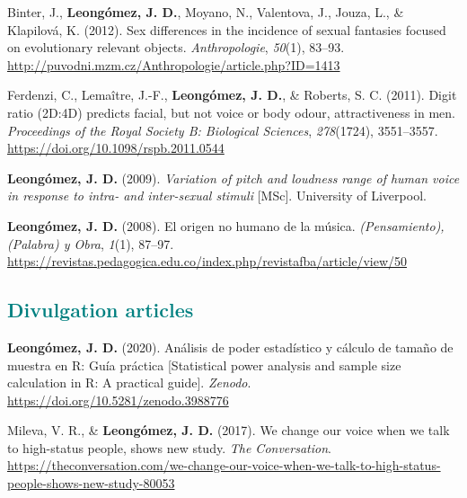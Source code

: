 \documentclass[11pt, a4paper]{awesome-cv}
\begin{document}
\leavevmode{}%
Binter, J., \textbf{Leongómez, J. D.}, Moyano, N., Valentova, J., Jouza,
L., \& Klapilová, K. (2012). {Sex differences in the incidence of sexual
fantasies focused on evolutionary relevant objects.}
\emph{Anthropologie}, \emph{50}(1), 83--93.
\url{http://puvodni.mzm.cz/Anthropologie/article.php?ID=1413}

\leavevmode{}%
Ferdenzi, C., Lemaître, J.-F., \textbf{Leongómez, J. D.}, \& Roberts, S.
C. (2011). {Digit ratio (2D:4D) predicts facial, but not voice or body
odour, attractiveness in men.} \emph{Proceedings of the Royal Society B:
Biological Sciences}, \emph{278}(1724), 3551--3557.
\url{https://doi.org/10.1098/rspb.2011.0544}

\leavevmode{}%
\textbf{Leongómez, J. D.} (2009). \emph{{Variation of pitch and loudness
range of human voice in response to intra- and inter-sexual stimuli}}
{[}MSc{]}. University of Liverpool.

\leavevmode{}%
\textbf{Leongómez, J. D.} (2008). {El origen no humano de la m{ú}sica}.
\emph{(Pensamiento), (Palabra) y Obra}, \emph{1}(1), 87--97.
\url{https://revistas.pedagogica.edu.co/index.php/revistafba/article/view/50}

\endgroup

\hypertarget{section-2}{%
\subsection{\texorpdfstring{\textcolor{teal}{Divulgation articles}}{}}\label{section-2}}

\begingroup
\setlength{\parindent}{-0.5in}
\setlength{\leftskip}{0.5in}

\hypertarget{refs_divulgation}{}
\leavevmode{}%
\textbf{Leongómez, J. D.} (2020). {Análisis de poder estadístico y
cálculo de tamaño de muestra en R: Guía práctica {[}Statistical power
analysis and sample size calculation in R: A practical guide{]}}.
\emph{Zenodo}. \url{https://doi.org/10.5281/zenodo.3988776}

\leavevmode{}%
Mileva, V. R., \& \textbf{Leongómez, J. D.} (2017). {We change our voice
when we talk to high-status people, shows new study}. \emph{The
Conversation}.
\url{https://theconversation.com/we-change-our-voice-when-we-talk-to-high-status-people-shows-new-study-80053}
\end{document}
